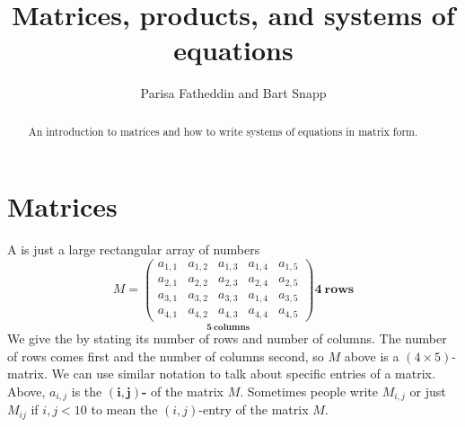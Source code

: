 \documentclass{ximera}
\author{Parisa Fatheddin and Bart Snapp}
\title{Matrices, products, and systems of equations}
\begin{document}
\begin{abstract}
  An introduction to matrices and how to write systems of equations in matrix form.
\end{abstract}
\maketitle

\section{Matrices}


A  is just a large rectangular array of numbers
\[
M =
\underset{\displaystyle\boldsymbol{5}~\textbf{columns}}{\begin{pmatrix}
  a_{1,1} & a_{1,2} & a_{1,3} & a_{1,4} & a_{1,5} \\
  a_{2,1} & a_{2,2} & a_{2,3} & a_{2,4} & a_{2,5} \\
  a_{3,1} & a_{3,2} & a_{3,3} & a_{1,4} & a_{3,5} \\
  a_{4,1} & a_{4,2} & a_{4,3} & a_{4,4} & a_{4,5}
\end{pmatrix}}
\boldsymbol{4}~\textbf {rows}
\]
We give the  by stating its number of rows
and number of columns. The number of rows comes first and the number of columns second, so $M$ above is
a $(4\times 5)$-matrix. We can use similar notation to talk about
specific entries of a matrix. Above, $a_{i,j}$ is the
$\boldsymbol{(i,j)}${\bf-} of the matrix $M$. Sometimes people write $M_{i,j}$ or just $M_{ij}$ if $i,j <10$ to mean the $(i,j)$-entry of the matrix $M$.
\end{document}
